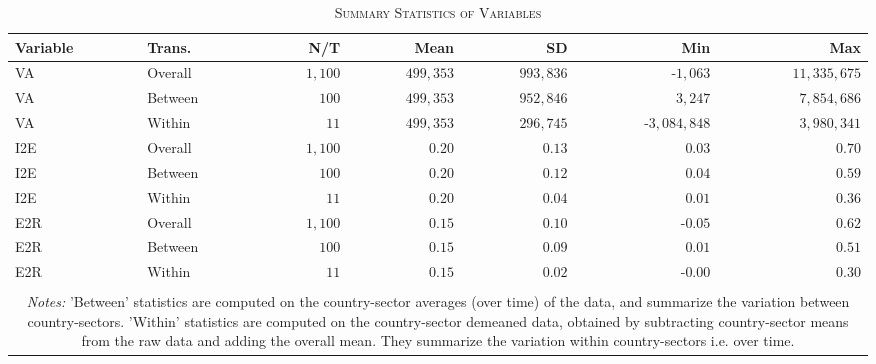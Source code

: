 \documentclass[a4paper]{article}
\begin{document}
\begin{table}[h!] \centering 
  \caption{\label{tab:SUMM_GROWTH}\textsc{Summary Statistics of Variables}}
  \begin{center}
\begin{tabular}{ llrrrrr} \toprule
Variable & Trans. & N/T & Mean & SD & Min & Max \\ \midrule
VA & Overall & $1,100$ & $499,353$ & $993,836$ & -$1,063$ & $11,335,675$ \\ 
VA & Between & $100$ & $499,353$ & $952,846$ & $3,247$ & $7,854,686$ \\ 
VA & Within & $11$ & $499,353$ & $296,745$ & -$3,084,848$ & $3,980,341$ \\ 
I2E & Overall & $1,100$ & $0.20$ & $0.13$ & $0.03$ & $0.70$ \\ 
I2E & Between & $100$ & $0.20$ & $0.12$ & $0.04$ & $0.59$ \\ 
I2E & Within & $11$ & $0.20$ & $0.04$ & $0.01$ & $0.36$ \\ 
E2R & Overall & $1,100$ & $0.15$ & $0.10$ & -$0.05$ & $0.62$ \\ 
E2R & Between & $100$ & $0.15$ & $0.09$ & $0.01$ & $0.51$ \\ 
E2R & Within & $11$ & $0.15$ & $0.02$ & -$0.00$ & $0.30$ \\ \bottomrule
\\ [-0.9em]
\multicolumn{7}{c}{\parbox{0.8\textwidth}{\scriptsize
\textit{Notes:} 'Between' statistics are computed on the country-sector averages (over time) of the data, and summarize the variation between country-sectors. 'Within' statistics are computed on the country-sector demeaned data, obtained by subtracting country-sector means from the raw data and adding the overall mean. They summarize the variation within country-sectors i.e. over time.}}
\end{tabular} 
 \end{center}
\end{table} 
\FloatBarrier 
\end{document}
